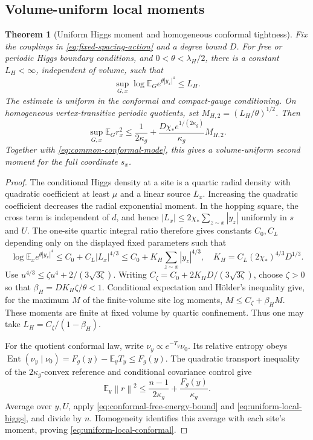 \documentclass[11pt,a4paper,oneside]{book}
\theoremstyle{plain}
\newtheorem{theorem}{Theorem}[chapter]
\theoremstyle{definition}
\theoremstyle{remark}
\newcommand{\E}{\mathbb E}
\newcommand{\norm}[1]{\left\lVert#1\right\rVert}
\newcommand{\src}[2]{\cite{#1}}
\begin{document}
\subsection{Volume-uniform local moments}
\begin{theorem}[Uniform Higgs moment and homogeneous conformal tightness]
\label{thm:fixed-spacing-moments}
Fix the couplings in \eqref{eq:fixed-spacing-action} and a degree bound
$D$.  For free or periodic Higgs boundary conditions, and
$0<\theta<\lambda_H/2$, there is a constant $L_H<\infty$, independent
of volume, such that
\begin{equation}
 \sup_{G,x}\log\E_G e^{\theta|y_x|^4}\le L_H.
 \label{eq:uniform-local-higgs}
\end{equation}
The estimate is uniform in the conformal and compact-gauge conditioning.
On homogeneous vertex-transitive periodic quotients, set
$M_{H,2}=(L_H/\theta)^{1/2}$.  Then
\begin{equation}
 \sup_{G,x}\E_G r_x^2
 \le\frac1{2\kappa_g}
 +\frac{D\chi_*e^{1/(2\kappa_g)}}{\kappa_g}M_{H,2}.
 \label{eq:uniform-local-conformal}
\end{equation}
Together with \eqref{eq:common-conformal-mode}, this gives a
volume-uniform second moment for the full coordinate $s_x$.
\end{theorem}
\begin{proof}
The conditional Higgs density at a site is a quartic radial density with
quadratic coefficient at least $\mu$ and a linear source $L_x$.  Increasing
the quadratic coefficient decreases the radial exponential moment.  In
the hopping square, the cross term is independent of $d$, and hence
$|L_x|\le2\chi_*\sum_{z\sim x}|y_z|$ uniformly in $s$ and $U$.
The one-site quartic integral ratio therefore gives constants $C_0,C_L$
depending only on the displayed fixed parameters such that
\[
 \log\E_x e^{\theta|y_x|^4}
 \le C_0+C_L|L_x|^{4/3}
 \le C_0+K_H\sum_{z\sim x}|y_z|^{4/3},
 \quad K_H=C_L(2\chi_*)^{4/3}D^{1/3}.
\]
Use $u^{4/3}\le\zeta u^4+2/(3\sqrt{3\zeta})$.  Writing
$C_\zeta=C_0+2K_HD/(3\sqrt{3\zeta})$, choose $\zeta>0$ so that
$\beta_H=DK_H\zeta/\theta<1$.  Conditional expectation and H\"older's
inequality give, for the maximum $M$ of the finite-volume site log
moments,
$M\le C_\zeta+\beta_HM$.  These moments are finite at fixed volume
by quartic confinement.  Thus one may take
$L_H=C_\zeta/(1-\beta_H)$.

For the quotient conformal law, write $\nu_y\propto e^{-T_y}\nu_0$.
Its relative entropy obeys
$\operatorname{Ent}(\nu_y\mid\nu_0)=F_g(y)-\E_yT_y\le F_g(y)$.
The quadratic transport inequality of the $2\kappa_g$-convex reference
and conditional covariance control give
\[
 \E_y\norm r^2\le\frac{n-1}{2\kappa_g}
                              +\frac{F_g(y)}{\kappa_g}.
\]
Average over $y,U$, apply \eqref{eq:conformal-free-energy-bound} and
\eqref{eq:uniform-local-higgs}, and divide by $n$.  Homogeneity identifies
this average with each site's moment, proving
\eqref{eq:uniform-local-conformal}.
\end{proof}
\src{R17}{thm:v17v41-ratio,thm:v17v41-row,thm:v17v41-uniform,thm:v17v42-conditional,cor:v17v42-local}
\end{document}
